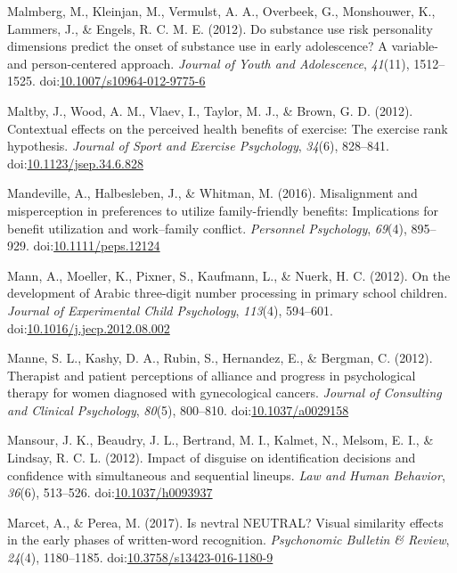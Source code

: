 \documentclass[english,man]{apa6}
\theoremstyle{definition}
\theoremstyle{definition}
\theoremstyle{definition}
\theoremstyle{remark}
\begin{document}
\hypertarget{ref-Malmberg2012}{}
Malmberg, M., Kleinjan, M., Vermulst, A. A., Overbeek, G., Monshouwer,
K., Lammers, J., \& Engels, R. C. M. E. (2012). Do substance use risk
personality dimensions predict the onset of substance use in early
adolescence? A variable- and person-centered approach. \emph{Journal of
Youth and Adolescence}, \emph{41}(11), 1512--1525.
doi:\href{https://doi.org/10.1007/s10964-012-9775-6}{10.1007/s10964-012-9775-6}

\hypertarget{ref-Maltby2012}{}
Maltby, J., Wood, A. M., Vlaev, I., Taylor, M. J., \& Brown, G. D.
(2012). Contextual effects on the perceived health benefits of exercise:
The exercise rank hypothesis. \emph{Journal of Sport and Exercise
Psychology}, \emph{34}(6), 828--841.
doi:\href{https://doi.org/10.1123/jsep.34.6.828}{10.1123/jsep.34.6.828}

\hypertarget{ref-Mandeville2016}{}
Mandeville, A., Halbesleben, J., \& Whitman, M. (2016). Misalignment and
misperception in preferences to utilize family-friendly benefits:
Implications for benefit utilization and work--family conflict.
\emph{Personnel Psychology}, \emph{69}(4), 895--929.
doi:\href{https://doi.org/10.1111/peps.12124}{10.1111/peps.12124}

\hypertarget{ref-Mann2012}{}
Mann, A., Moeller, K., Pixner, S., Kaufmann, L., \& Nuerk, H. C. (2012).
On the development of Arabic three-digit number processing in primary
school children. \emph{Journal of Experimental Child Psychology},
\emph{113}(4), 594--601.
doi:\href{https://doi.org/10.1016/j.jecp.2012.08.002}{10.1016/j.jecp.2012.08.002}

\hypertarget{ref-Manne2012}{}
Manne, S. L., Kashy, D. A., Rubin, S., Hernandez, E., \& Bergman, C.
(2012). Therapist and patient perceptions of alliance and progress in
psychological therapy for women diagnosed with gynecological cancers.
\emph{Journal of Consulting and Clinical Psychology}, \emph{80}(5),
800--810. doi:\href{https://doi.org/10.1037/a0029158}{10.1037/a0029158}

\hypertarget{ref-Mansour2012}{}
Mansour, J. K., Beaudry, J. L., Bertrand, M. I., Kalmet, N., Melsom, E.
I., \& Lindsay, R. C. L. (2012). Impact of disguise on identification
decisions and confidence with simultaneous and sequential lineups.
\emph{Law and Human Behavior}, \emph{36}(6), 513--526.
doi:\href{https://doi.org/10.1037/h0093937}{10.1037/h0093937}

\hypertarget{ref-Marcet2016}{}
Marcet, A., \& Perea, M. (2017). Is nevtral NEUTRAL? Visual similarity
effects in the early phases of written-word recognition.
\emph{Psychonomic Bulletin \& Review}, \emph{24}(4), 1180--1185.
doi:\href{https://doi.org/10.3758/s13423-016-1180-9}{10.3758/s13423-016-1180-9}
\end{document}
